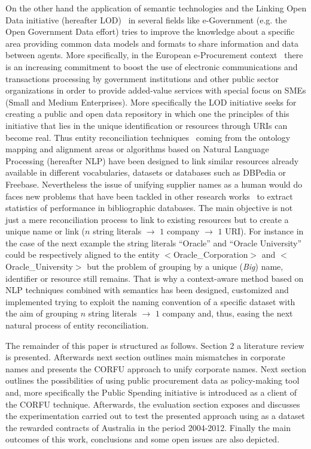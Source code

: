 \documentclass[1p,12pt]{elsarticle}
\begin{document}
On the other hand the application of semantic technologies and the Linking Open Data initiative (hereafter LOD)~\citep{Berners-Lee-2006,Heath_Bizer_2011}  
in several fields like e-Government (e.g. the Open Government Data effort) tries to improve the knowledge about a specific area providing 
common data models and formats to share information and data between agents. More specifically, in the European e-Procurement 
context~\citep{e-Proc-map-paper} there is an increasing commitment to boost the use of electronic communications and transactions 
processing by government institutions and other public sector organizations in order to provide added-value services with special focus on SMEs (Small and Medium Enterprises). 
More specifically the LOD initiative seeks for creating a public and open data repository in which one the principles of this initiative that lies in the 
unique identification or resources through URIs can become real. Thus entity reconciliation techniques~\citep{Serimi,conf/www/MaaliCP11} 
coming from the ontology mapping and alignment areas or algorithms based on Natural Language Processing (hereafter NLP) have been 
designed to link similar resources already available in different vocabularies, datasets or databases such as DBPedia or Freebase. 
Nevertheless the issue of unifying supplier names as a human would do faces new problems that have been tackled in 
other research works~\citep{Galvez2006} to extract statistics of performance in bibliographic databases. The main objective is not just a 
mere reconciliation process to link to existing resources but to create a unique name or link ($n$ string literals $\to$ $1$ company $\to$ $1$ URI). 
For instance in the case of the next example the string literals ``Oracle'' and ``Oracle University'' could be respectively aligned to the entity $<$Oracle\_Corporation$>$ and $<$Oracle\_University$>$ but 
the problem of grouping by a unique (\textit{Big}) name, identifier or resource still remains. That is why a context-aware method based on NLP 
techniques combined with semantics has been designed, customized and implemented trying to exploit the naming convention of a specific dataset with the aim 
of grouping $n$ string literals $\to$ $1$ company and, thus, easing the next natural process of entity reconciliation.

The remainder of this paper is structured as follows. Section 2 a literature review is presented. Afterwards next section outlines main mismatches in corporate names and presents the CORFU approach to unify corporate names. Next section outlines the possibilities of using public procurement data as policy-making tool and, more specifically the Public Spending initiative is introduced as a client of the CORFU technique. Afterwards, the evaluation section exposes and discusses the experimentation carried out to test the presented approach using as a dataset the rewarded contracts of Australia in the period 2004-2012. Finally the main outcomes of this work, conclusions and some open issues are also depicted.
\end{document}
